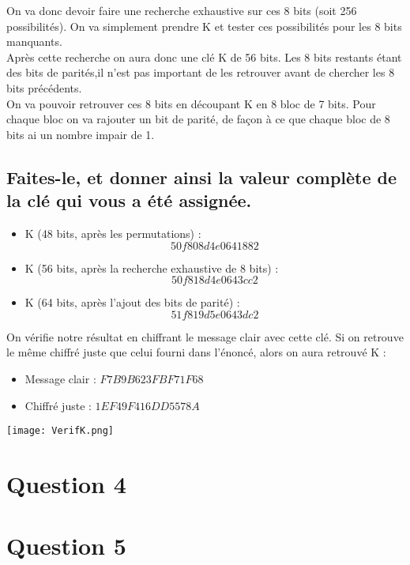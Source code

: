 \documentclass[a4paper,11pt]{article}
\begin{document}
	On va donc devoir faire une recherche exhaustive sur ces 8 bits (soit 256 possibilités). On va simplement prendre K et tester ces possibilités pour les 8 bits manquants.\\
	Après cette recherche on aura donc une clé K de 56 bits. Les 8 bits restants étant des bits de parités,il n'est pas important de les retrouver avant de chercher les 8 bits précédents.\\
	On va pouvoir retrouver ces 8 bits en découpant K en 8 bloc de 7 bits. Pour chaque bloc on va rajouter un bit de parité, de façon à ce que chaque bloc de 8 bits ai un nombre impair de 1.
	
	\subsection{Faites-le, et donner ainsi la valeur complète de la clé qui vous a été assignée.}
	\begin{itemize}
		\item K (48 bits, après les permutations) : $$ 50f808d4e0641882 $$
		\item K (56 bits, après la recherche exhaustive de 8 bits) :
		$$ 50f818d4e0643cc2 $$
		\item K (64 bits, après l'ajout des bits de parité) : 
		$$ 51f819d5e0643dc2 $$
	\end{itemize}
	On vérifie notre résultat en chiffrant le message clair avec cette clé. Si on retrouve le même chiffré juste que celui fourni dans l'énoncé, alors on aura retrouvé K : 
	\begin{itemize}
		\item Message clair : $F7 B9 B6 23 FB F7 1F 68$
		\item Chiffré juste : $1E F4 9F 41 6D D5 57 8A $ 
	\end{itemize}
	\begin{center}\texttt{[image: VerifK.png]}\end{center} 
	\section{Question 4}
	
	\section{Question 5}
\end{document}
